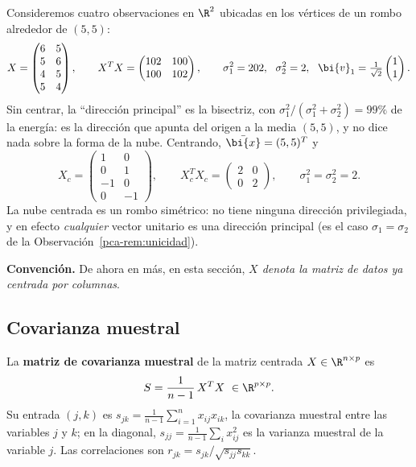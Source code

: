 \begin{example}\label{pca-ej:centrar}
Consideremos cuatro observaciones en $\R^2$ ubicadas en los vértices de un
rombo alrededor de $(5,5)$:
\[
X=\begin{pmatrix}6&5\\5&6\\4&5\\5&4\end{pmatrix},\qquad
X^T X=\begin{pmatrix}102&100\\100&102\end{pmatrix},\qquad
\sigma_1^2=202,\ \ \sigma_2^2=2,\ \ \bi{v}_1=\tfrac1{\sqrt2}\begin{pmatrix}1\\1\end{pmatrix}.
\]
Sin centrar, la ``dirección principal'' es la bisectriz, con
$\sigma_1^2/(\sigma_1^2+\sigma_2^2)=99\%$ de la energía: es la dirección que
apunta del origen a la media $(5,5)$, y no dice nada sobre la forma de la nube.
Centrando, $\bar{\bi{x}}=(5,5)^T$ y
\[
X_c=\begin{pmatrix}1&0\\0&1\\-1&0\\0&-1\end{pmatrix},\qquad
X_c^T X_c=\begin{pmatrix}2&0\\0&2\end{pmatrix},\qquad
\sigma_1^2=\sigma_2^2=2 .
\]
La nube centrada es un rombo simétrico: no tiene ninguna dirección
privilegiada, y en efecto \emph{cualquier} vector unitario es una dirección
principal (es el caso $\sigma_1=\sigma_2$ de la Observación~\ref{pca-rem:unicidad}).
\end{example}

\medskip
\noindent\textbf{Convención.} De ahora en más, en esta sección, \emph{$X$
denota la matriz de datos ya centrada por columnas}.

\subsection{Covarianza muestral}

\begin{definition}
La \textbf{matriz de covarianza muestral} de la matriz centrada
$X\in\R^{n\times p}$ es
\[
S=\frac{1}{n-1}\,X^T X\ \in\R^{p\times p}.
\]
Su entrada $(j,k)$ es $s_{jk}=\frac1{n-1}\sum_{i=1}^nx_{ij}x_{ik}$, la
covarianza muestral entre las variables $j$ y $k$; en la diagonal,
$s_{jj}=\frac1{n-1}\sum_i x_{ij}^2$ es la varianza muestral de la variable
$j$. Las correlaciones son $r_{jk}=s_{jk}/\sqrt{s_{jj}s_{kk}}$.
\end{definition}

